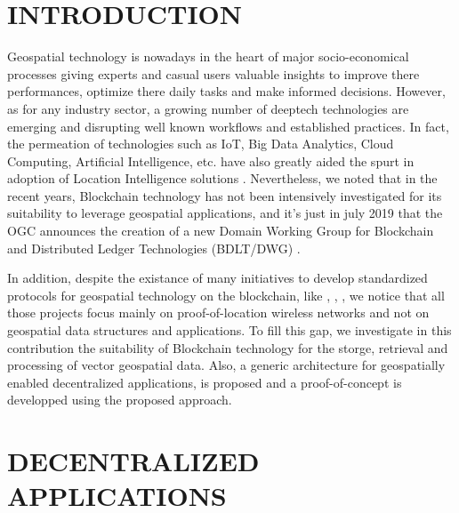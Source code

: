 \documentclass{isprs} %
\begin{document}

\maketitle


\section{INTRODUCTION}\label{INTRODUCTION}
 
\sloppy

Geospatial technology is nowadays in the heart of major socio-economical processes giving experts and casual users valuable insights to improve there performances, optimize there daily tasks and make informed decisions. However, as for any industry sector, a growing number of deeptech technologies are emerging and disrupting well known workflows and established practices. In fact, the permeation of technologies such as IoT, Big Data Analytics, Cloud Computing, Artificial Intelligence, etc. have also greatly aided the spurt in adoption of Location Intelligence solutions \cite{geobuiz2019}. Nevertheless, we noted that in the recent years, Blockchain technology has not been intensively investigated for its suitability to leverage geospatial applications, and it's just in july 2019 that the OGC announces the creation of a new Domain Working Group for Blockchain and Distributed Ledger Technologies (BDLT/DWG) \cite{ogcbdltdwg}.

In addition, despite the existance of many initiatives to develop standardized protocols for geospatial technology on the blockchain, like \cite{foam}, \cite{xyo}, \cite{helium}, we notice that all those projects focus mainly on proof-of-location wireless networks and not on geospatial data structures and applications. To fill this gap, we investigate in this contribution the suitability of Blockchain technology for the storge, retrieval and processing of vector geospatial data. Also, a generic architecture for geospatially enabled decentralized applications, is proposed and a proof-of-concept is developped using the proposed approach.

\newpage

\section{DECENTRALIZED APPLICATIONS}\label{sec:DECENTRALIZED APPLICATIONS}
 
\end{document}
